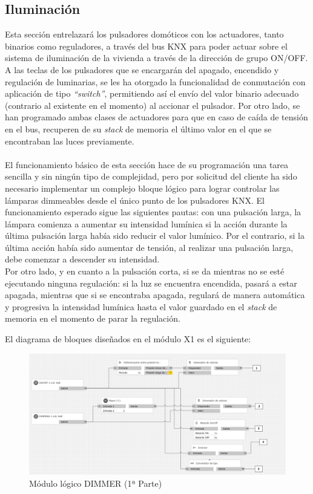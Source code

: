 \subsection{Iluminación} Esta sección entrelazará los pulsadores domóticos con los actuadores, tanto binarios como reguladores, a través del bus KNX para poder actuar sobre el sistema de iluminación de la vivienda a través de la dirección de grupo ON/OFF. A las teclas de los pulsadores que se encargarán del apagado, encendido y regulación de luminarias, se les ha otorgado la funcionalidad de conmutación con aplicación de tipo \textit {“switch”}, permitiendo así el envío del valor binario adecuado (contrario al existente en el momento) al accionar el pulsador. Por otro lado, se han programado ambas clases de actuadores para que en caso de caída de tensión en el bus, recuperen de su \textit {stack} de memoria el último valor en el que se encontraban las luces previamente. \\\\
El funcionamiento básico de esta sección hace de su programación una tarea sencilla y sin ningún tipo de complejidad, pero por solicitud del cliente ha sido necesario implementar un complejo bloque lógico para lograr controlar las lámparas dimmeables desde el único punto de los pulsadores KNX. El funcionamiento esperado sigue las siguientes pautas: con una pulsación larga, la lámpara comienza a aumentar su intensidad lumínica si la acción durante la última pulsación larga había sido reducir el valor lumínico. Por el contrario, si la última acción había sido aumentar de tensión, al realizar una pulsación larga, debe comenzar a descender su intensidad. \\
Por otro lado, y en cuanto a la pulsación corta, si se da mientras no se esté ejecutando ninguna regulación: si la luz se encuentra encendida, pasará a estar apagada, mientras que si se encontraba apagada, regulará de manera automática y progresiva la intensidad lumínica hasta el valor guardado en el \textit {stack} de memoria en el momento de parar la regulación.

 El diagrama de bloques diseñados en el módulo X1 es el siguiente:
\begin{center}
\begin{figure}[H]
\includegraphics[width=1\textwidth]{figures/log_dimm_izq.png}   
\caption{Módulo lógico DIMMER (1ª Parte)}
\label{fig:log_dimm_izq}
\end{figure}
\end{center}

